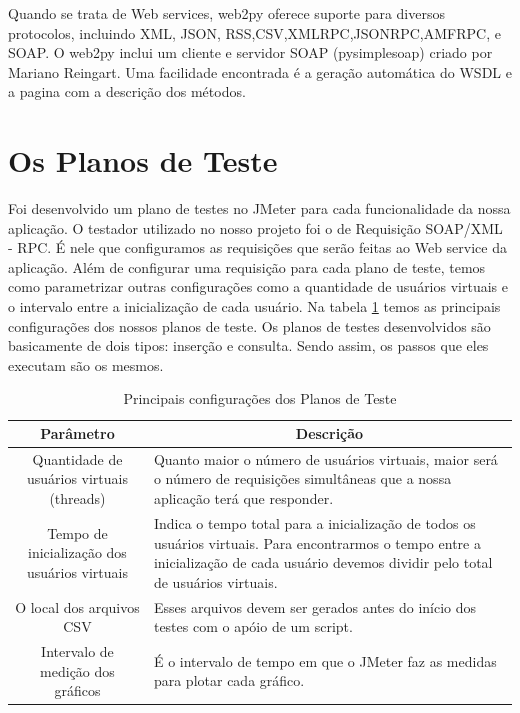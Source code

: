 Quando se trata de Web services, web2py oferece suporte para diversos protocolos, incluindo XML, JSON, RSS,CSV,XMLRPC,JSONRPC,AMFRPC, e SOAP.  O web2py inclui um cliente e servidor SOAP (pysimplesoap) criado por Mariano Reingart. Uma facilidade encontrada é a geração automática do WSDL e a pagina com a descrição dos métodos.

\section{Os Planos de Teste}

Foi desenvolvido um plano de testes no JMeter para cada funcionalidade da nossa aplicação. O testador utilizado no nosso projeto foi o de Requisição SOAP/XML - RPC. É nele que configuramos as requisições que serão feitas ao Web service da aplicação. Além de configurar uma requisição para cada plano de teste, temos como parametrizar outras configurações como a quantidade de usuários virtuais e o intervalo entre a inicialização de cada usuário. Na tabela \ref{tab:configplanoteste} temos as principais configurações dos nossos planos de teste. Os planos de testes desenvolvidos são basicamente de dois tipos: inserção e consulta. Sendo assim, os passos que eles executam são os mesmos.

\begin{table}
	\caption{Principais configurações dos Planos de Teste}
	\begin{center}
	\begin{tabularx}{\textwidth}{ | c | X | }
	\hline
		\textbf{Parâmetro} & \multicolumn{1}{c|}{\textbf{Descrição}} \\
	\hline
		Quantidade de usuários virtuais (threads) & Quanto maior o número de usuários virtuais, maior será o número de requisições simultâneas que a nossa aplicação terá que responder.\\
	\hline 
		Tempo de inicialização dos usuários virtuais & Indica o tempo total para a inicialização de todos os usuários virtuais. Para encontrarmos o tempo entre a inicialização de cada usuário devemos dividir pelo total de usuários virtuais.\\
	\hline
		O local dos arquivos CSV & Esses arquivos devem ser gerados antes do início dos testes com o apóio de um script.\\
	\hline
		Intervalo de medição dos gráficos & É o intervalo de tempo em que o JMeter faz as medidas para plotar cada gráfico.\\
	\hline
	\end {tabularx}
	\end{center}
	\label{tab:configplanoteste}
\end{table}

